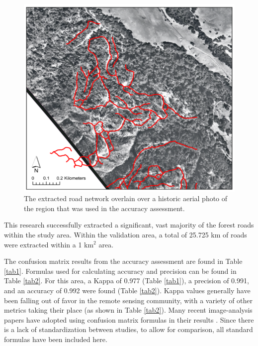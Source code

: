 \documentclass[remotesensing,article,accept,pdftex,moreauthors]{Definitions/mdpi}
\begin{document}
\begin{figure}[H]
\includegraphics[width=11 cm]{roads.png}
\caption{The extracted road network overlain over a historic aerial photo of the region that was used in the accuracy assessment. \label{fig8}}
\end{figure} 

This research successfully extracted a significant, vast majority of the forest roads within the study area. Within the validation area, a total of 25.725 km of roads were extracted within a 1 km$^2$ area. 

The confusion matrix results from the accuracy assessment are found in Table \ref{tab1}. Formulas used for calculating accuracy and precision can be found in Table \ref{tab2}. For this area, a Kappa of 0.977 (Table \ref{tab1}), a precision of 0.991, and an accuracy of 0.992 were found (Table \ref{tab2}). Kappa values generally have been falling out of favor in the remote sensing community, with a variety of other metrics taking their place \cite{guillen} (as shown in Table \ref{tab2}). Many recent image-analysis papers have adopted using confusion matrix formulas in their results \cite{foody, guillen, papp, prakash, sivakumar, yang}. Since there is a lack of standardization between studies, to allow for comparison, all standard formulas have been included here.
\end{document}
